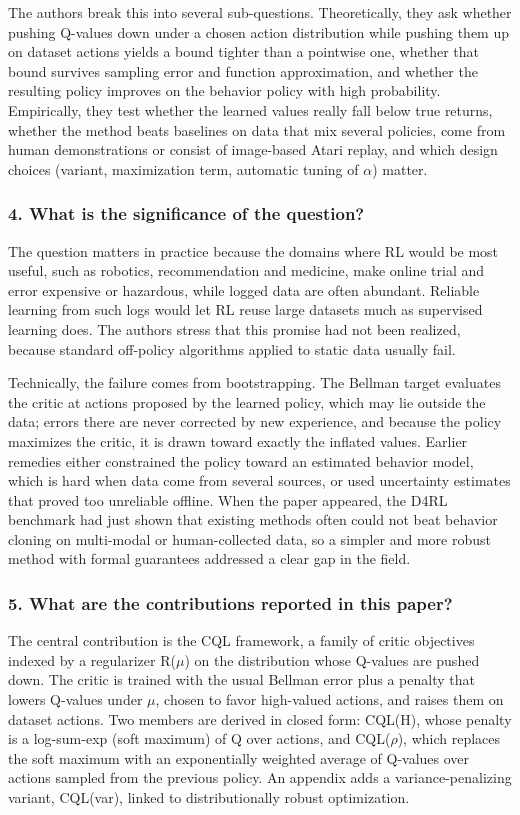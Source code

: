 \documentclass[11pt]{article}
\newcommand{\question}[1]{\subsubsection*{#1}}
\begin{document}
The authors break this into several sub-questions. Theoretically, they ask whether pushing Q-values down under a chosen action distribution while pushing them up on dataset actions yields a bound tighter than a pointwise one, whether that bound survives sampling error and function approximation, and whether the resulting policy improves on the behavior policy with high probability. Empirically, they test whether the learned values really fall below true returns, whether the method beats baselines on data that mix several policies, come from human demonstrations or consist of image-based Atari replay, and which design choices (variant, maximization term, automatic tuning of \ensuremath{\alpha}) matter.

\question{4. What is the significance of the question?}

The question matters in practice because the domains where RL would be most useful, such as robotics, recommendation and medicine, make online trial and error expensive or hazardous, while logged data are often abundant. Reliable learning from such logs would let RL reuse large datasets much as supervised learning does. The authors stress that this promise had not been realized, because standard off-policy algorithms applied to static data usually fail.

Technically, the failure comes from bootstrapping. The Bellman target evaluates the critic at actions proposed by the learned policy, which may lie outside the data; errors there are never corrected by new experience, and because the policy maximizes the critic, it is drawn toward exactly the inflated values. Earlier remedies either constrained the policy toward an estimated behavior model, which is hard when data come from several sources, or used uncertainty estimates that proved too unreliable offline. When the paper appeared, the D4RL benchmark had just shown that existing methods often could not beat behavior cloning on multi-modal or human-collected data, so a simpler and more robust method with formal guarantees addressed a clear gap in the field.

\question{5. What are the contributions reported in this paper?}

The central contribution is the CQL framework, a family of critic objectives indexed by a regularizer R(\ensuremath{\mu}) on the distribution whose Q-values are pushed down. The critic is trained with the usual Bellman error plus a penalty that lowers Q-values under \ensuremath{\mu}, chosen to favor high-valued actions, and raises them on dataset actions. Two members are derived in closed form: CQL(H), whose penalty is a log-sum-exp (soft maximum) of Q over actions, and CQL(\ensuremath{\rho}), which replaces the soft maximum with an exponentially weighted average of Q-values over actions sampled from the previous policy. An appendix adds a variance-penalizing variant, CQL(var), linked to distributionally robust optimization.
\end{document}

